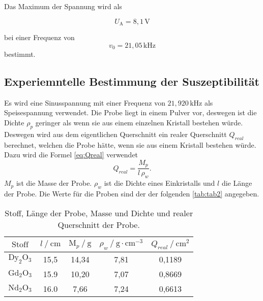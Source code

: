 Das Maximum der Spannung wird als

\begin{equation}
    U_\text{A} = 8,1 \, \unit{\volt}
\end{equation}

bei einer Frequenz von 
\begin{equation}
    v_0 = 21,05 \, \unit{\kilo\hertz}
\end{equation}
bestimmt.



\subsection{Experiemntelle Bestimmung der Suszeptibilität}

Es wird eine Sinusspannung mit einer Frequenz von $ 21,920 \, \unit{\kilo\hertz}$ als Speisespannung verwendet.
Die Probe liegt in einem Pulver vor, deswegen ist die Dichte $ \rho_p$ geringer als wenn sie aus einem einzelnen Kristall bestehen würde.
Deswegen wird aus dem eigentlichen Querschnitt ein realer Querschnitt $Q_{real} $ berechnet, welchen die Probe hätte, wenn sie aus einem Kristall bestehen würde.
Dazu wird die Formel \eqref{eq:Qreal} verwendet
\begin{equation}
    Q_{real} = \frac{M_p}{l \, \rho_w} .
    \label{eq:Qreal}
\end{equation}
$M_p$ ist die Masse der Probe. $\rho_w$ ist die Dichte eines Einkristalls und $l$ die Länge der Probe.
Die Werte für die Proben sind der der folgenden \autoref{tab:tab2} angegeben.


\begin{table}[H]
    \centering
    \caption{Stoff, Länge der Probe, Masse und Dichte und realer Querschnitt der Probe.}
    \label{tab:tab2}
    \begin{tabular}{S S S S S}
      \toprule
        {$\text{Stoff}$}&{$l \mathbin{/} \unit{\centi\meter} $}&{$\text{M}_p \mathbin{/} \unit{\gram} $}&{$ \rho_w \mathbin{/} \unit{\gram} \cdot \unit{\centi\meter}^{-3}$}&{$Q_{real} \mathbin{/} \unit{\centi\meter}^{2}$}\\
        \midrule
        {$\text{Dy}_2 \text{O}_3$} & {15,5}& {14,34}&{7,81}&{0,1189}\\
        {$\text{Gd}_2 \text{O}_3$} & {15.9}& {10,20}&{7,07}&{0,8669}\\
        {$\text{Nd}_2 \text{O}_3$} & {16.0}& {7,66} &{7,24}&{0,6613}\\
      \bottomrule
    \end{tabular}
\end{table}


